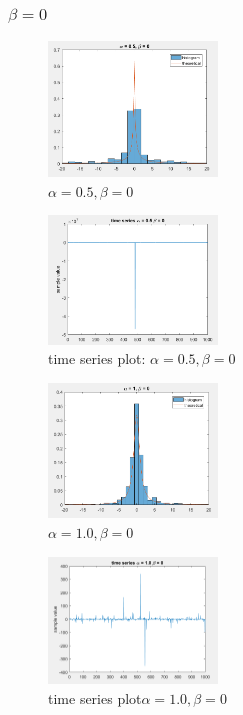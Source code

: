\documentclass[twoside]{article}
\begin{document}
\begin{multicols*}{2}
\subsubsection{$\beta = 0$}
\begin{figure}[H]
   \centering
   \includegraphics[width = 0.4\textwidth]{../data/a05b0.png}  
   \caption{$\alpha = 0.5, \beta = 0$}
\end{figure}
\begin{figure}[H]
   \centering
   \includegraphics[width = 0.4\textwidth]{../data/a05b0time.png}  
   \caption{time series plot: $\alpha = 0.5, \beta = 0$}
\end{figure}

\begin{figure}[H]
   \centering
   \includegraphics[width = 0.4\textwidth]{../data/a1b0.png}  
   \caption{$\alpha = 1.0, \beta = 0$}
\end{figure}
\begin{figure}[H]
   \centering
   \includegraphics[width = 0.4\textwidth]{../data/a1b0time.png}  
   \caption{time series plot$\alpha = 1.0, \beta = 0$}
\end{figure}


\end{multicols*}
\end{document}
